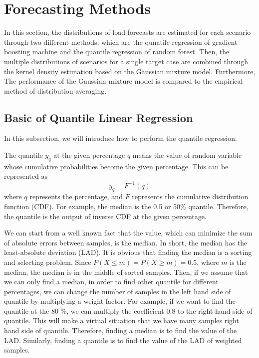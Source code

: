 \documentclass[journal]{IEEEtran} %
\begin{document}
\section{Forecasting Methods}
In this section, the distributions of load forecasts are estimated for each scenario through two different methods, which are the qunatile regression of gradient boosting machine and the quantile regression of random forest. Then, the multiple distributions of scenarios for a single target case are combined through the kernel density estimation based on the Gaussian mixture model. Furthermore, The performance of the Gaussian mixture model is compared to the empirical method of distribution averaging. 





\subsection{Basic of Quantile Linear Regression}
In this subsection, we will introduce how to perform the quantile regression.

The quantile $y_q$ at the given percentage $q$ means the value of random variable whose cumulative probabilities become the given percentage. This can be represented as 
\begin{equation}
\label{QuantileDefinition}
{y_q} = {F^{ - 1}}(q)
\end{equation}
where $q$ represents the percentage, and $F$ represents the cumulative distribution function (CDF). 
For example, the median is the 0.5 or 50\% quantile. Therefore, the quantile is the output of inverse CDF at the given percentage.




We can start from a well known fact that the value, which can minimize the sum of absolute errors between samples, is the median. In short, the median has the least-absolute deviation (LAD). It is obvious that finding the median is a sorting and selecting problem. Since $P(X \le m) = P(X \ge m) = 0.5$, where $m$ is the median, the median is in the middle of sorted samples. Then, if we assume that we can only find a median, in order to find other quantile for different percentages, we can change the number of samples in the left hand side of quantile by multiplying a weight factor. For example, if we want to find the quantile at the 80 \%, we can multiply the coefficient 0.8 to the right hand side of quantile. This will make a virtual situation that we have many samples right hand side of quantile. Therefore, finding a median is to find the value of the LAD. Similarly, finding a quantile is to find the value of the LAD of weighted samples.
\end{document}

